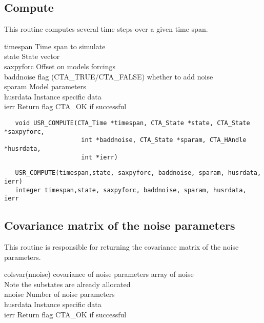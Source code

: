 \subsection{Compute}
This routine computes several time steps over a given time span.

\horzline
\begin{tabbing}
\functab
{}
     {timespan}  {Time span to simulate}\\
 {state}     {State vector}\\
     {saxpyforc} {Offset on models forcings}\\
     {baddnoise} {flag (CTA\_TRUE/CTA\_FALSE) whether to add noise}\\
     {sparam}    {Model parameters}\\
 {husrdata}  {Instance specific data}\\
    {ierr}      {Return flag CTA\_OK if successful}\\
\end{tabbing}
\horzline

\begin{verbatim}
   void USR_COMPUTE(CTA_Time *timespan, CTA_State *state, CTA_State *saxpyforc,
                     int *baddnoise, CTA_State *sparam, CTA_HAndle *husrdata,
                     int *ierr)
\end{verbatim}

\begin{verbatim}
   USR_COMPUTE(timespan,state, saxpyforc, baddnoise, sparam, husrdata, ierr)
   integer timespan,state, saxpyforc, baddnoise, sparam, husrdata, ierr
\end{verbatim}

\subsection{Covariance matrix of the noise parameters}
This routine is responsible for returning the covariance matrix of the noise parameters.

\horzline
\begin{tabbing}
\functab
{}
 {colsvar(nnoise)}   {covariance of noise parameters array of noise}\\
\funcline{}    {}                  {Note the substates are already allocated}\\
     {nnoise}    {Number of noise parameters}\\
 {husrdata}  {Instance specific data}\\
    {ierr}      {Return flag CTA\_OK if successful}\\
\end{tabbing}
\horzline

